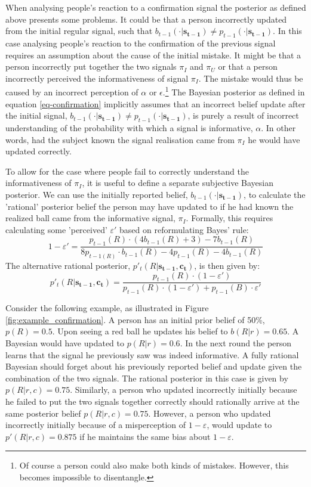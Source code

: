 \documentclass{article}
\begin{document}
When analysing people's reaction to a confirmation signal the posterior as defined above presents some problems. It could be that a person incorrectly updated from the initial regular signal, such that $b_{t-1}(\cdot|\mathbf{s_{t-1}}) \neq p_{t-1}(\cdot|\mathbf{s_{t-1}})$. In this case analysing people's reaction to the confirmation of the previous signal requires an assumption about the cause of the initial mistake. It might be that a person incorrectly put together the two signals $\pi_I$ and $\pi_U$ or that a person incorrectly perceived the informativeness of signal $\pi_I$. The mistake would thus be caused by an incorrect perception of $\alpha$ or $\epsilon$.\footnote{Of course a person could also make both kinds of mistakes. However, this becomes impossible to disentangle.} The Bayesian posterior as defined in equation \ref{eq-confirmation} implicitly assumes that an incorrect belief update after the initial signal, $b_{t-1}(\cdot|\mathbf{s_{t-1}}) \neq p_{t-1}(\cdot|\mathbf{s_{t-1}})$, is purely a result of incorrect understanding of the probability with which a signal is informative, $\alpha$. In other words, had the subject known the signal realisation came from $\pi_I$ he would have updated correctly. 

To allow for the case where people fail to correctly understand the informativeness of $\pi_I$, it is useful to define a separate subjective Bayesian posterior. We can use the initially reported belief, $b_{t-1}(\cdot|\mathbf{s_{t-1}})$, to calculate the 'rational' posterior belief the person may have updated to if he had known the realized ball came from the informative signal, $\pi_I$. Formally, this requires calculating some 'perceived' $\varepsilon'$ based on reformulating Bayes' rule:
\begin{equation*}
    1-\varepsilon' = \frac{p_{t-1}(R)\cdot(4b_{t-1}(R)+3)-7b_{t-1}(R)}{8p_{t-1(R)}\cdot b_{t-1}(R)-4p_{t-1}(R)-4b_{t-1}(R)}
\end{equation*}
The alternative rational posterior, $p'_t(R|\mathbf{s_{t-1},\mathbf{c_t}})$, is then given by:
\begin{equation}
    \label{eq-confirmation-alt}
    p'_t(R|\mathbf{s_{t-1},\mathbf{c_t}})=\frac{p_{t-1}(R)\cdot(1-\varepsilon')}{p_{t-1}(R)\cdot(1-\varepsilon')+p_{t-1}(B)\cdot\varepsilon'}
\end{equation}

Consider the following example, as illustrated in Figure \ref{fig:example_confirmation}. A person has an initial prior belief of 50\%, $p(R)=0.5$. Upon seeing a red ball he updates his belief to $b(R|r)=0.65$. A Bayesian would have updated to $p(R|r)=0.6$. In the next round the person learns that the signal he previously saw was indeed informative. A fully rational Bayesian should forget about his previously reported belief and update given the combination of the two signals. The rational posterior in this case is given by $p(R|r,c)=0.75$. Similarly, a person who updated incorrectly initially because he failed to put the two signals together correctly should rationally arrive at the same posterior belief $p(R|r,c)=0.75$. However, a person who updated incorrectly initially because of a misperception of $1-\varepsilon$, would update to $p'(R|r,c)=0.875$ if he maintains the same bias about $1-\varepsilon$.
\end{document}
